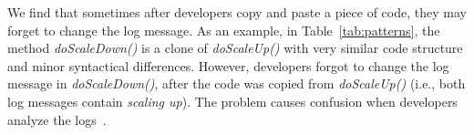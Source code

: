 




 We find that sometimes after developers copy and paste a piece of code, they may forget to change the log message. As an example, in Table~\ref{tab:patterns}, the method {\em doScaleDown()} is a clone of {\em doScaleUp()} with very similar code structure and minor syntactical differences. However, developers forgot to change the log message in {\em doScaleDown()}, after the code was copied from {\em doScaleUp()} (i.e., both log messages contain {\em scaling up}). The problem causes confusion when developers analyze the logs~\cite{es-issue-forM}. %





